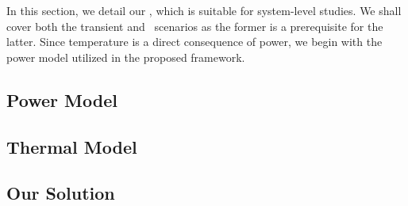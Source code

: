 In this section, we detail our \ta, which is suitable for system-level studies.
We shall cover both the transient and \dss\ scenarios as the former is a prerequisite for the latter.
Since temperature is a direct consequence of power, we begin with the power model utilized in the proposed framework.

\subsection{Power Model} 


\subsection{Thermal Model} 


\subsection{Our Solution} 


